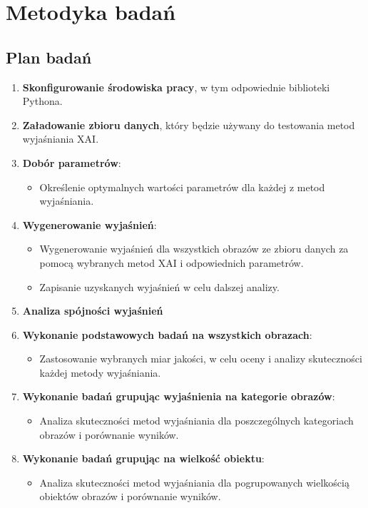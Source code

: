 
\chapter*{Metodyka badań}

\section*{Plan badań}

\begin{enumerate}
	\item \textbf{Skonfigurowanie środowiska pracy}, w tym odpowiednie biblioteki Pythona.
	\item \textbf{Załadowanie zbioru danych}, który będzie używany do testowania metod wyjaśniania XAI.
	\item \textbf{Dobór parametrów}:
	      \begin{itemize}
		      \item Określenie optymalnych wartości parametrów dla każdej z metod wyjaśniania.
	      \end{itemize}
	\item \textbf{Wygenerowanie wyjaśnień}:
	      \begin{itemize}
		      \item Wygenerowanie wyjaśnień dla wszystkich obrazów ze zbioru danych za pomocą wybranych metod XAI i odpowiednich parametrów.
		      \item Zapisanie uzyskanych wyjaśnień w celu dalszej analizy.
	      \end{itemize}
	\item \textbf{Analiza spójności wyjaśnień}
	\item \textbf{Wykonanie podstawowych badań na wszystkich obrazach}:
	      \begin{itemize}
		      \item Zastosowanie wybranych miar jakości, w celu oceny i analizy skuteczności każdej metody wyjaśniania.
	      \end{itemize}
	\item \textbf{Wykonanie badań grupując wyjaśnienia na kategorie obrazów}:
	      \begin{itemize}
		      \item Analiza skuteczności metod wyjaśniania dla poszczególnych kategoriach obrazów i porównanie wyników.
	      \end{itemize}
	\item \textbf{Wykonanie badań grupując na wielkość obiektu}:
	      \begin{itemize}
		      \item Analiza skuteczności metod wyjaśniania dla pogrupowanych wielkością obiektów obrazów i porównanie wyników.
	      \end{itemize}


\end{enumerate}
